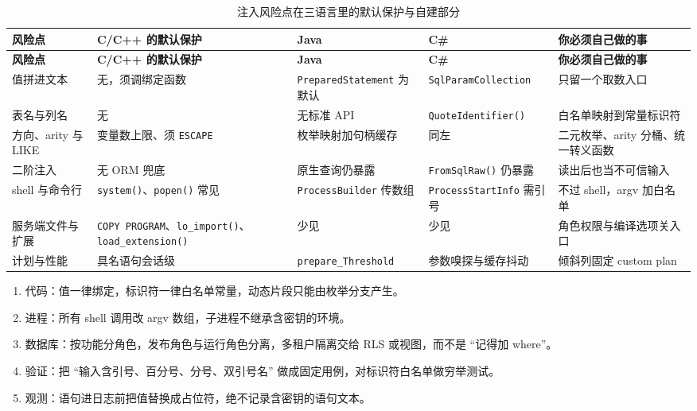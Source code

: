 \documentclass[12pt,a4paper,fontset=fandol]{ctexbook}
\newcommand{\Fn}[1]{\texttt{#1()}}
\newcommand{\Tp}[1]{\texttt{#1}}
\newcommand{\CSharp}{C\#}
\newcommand{\CppJava}{C/C++}
\begin{document}
\begin{scriptsize}
\setlength{\tabcolsep}{3pt}
\begin{longtable}{@{}>{\raggedright\arraybackslash}p{}
                  >{\raggedright\arraybackslash}p{}
                  >{\raggedright\arraybackslash}p{}
                  >{\raggedright\arraybackslash}p{}
                  >{\raggedright\arraybackslash}p{}@{}}
\caption{注入风险点在三语言里的默认保护与自建部分} \\
\toprule
\textbf{风险点} & \textbf{\CppJava{} 的默认保护} & \textbf{Java} &
\textbf{\CSharp{}} & \textbf{你必须自己做的事} \\
\midrule
\endfirsthead
\toprule
\textbf{风险点} & \textbf{\CppJava{} 的默认保护} & \textbf{Java} &
\textbf{\CSharp{}} & \textbf{你必须自己做的事} \\
\midrule
\endhead
\bottomrule
\endfoot
值拼进文本 & 无，须调绑定函数 & \Tp{Prepared\allowbreak Statement} 为默认 &
\Tp{Sql\allowbreak Param\allowbreak Collection} & 只留一个取数入口 \\
\addlinespace
表名与列名 & 无 & 无标准 API & \Fn{Quote\allowbreak Identifier} &
白名单映射到常量标识符 \\
\addlinespace
方向、arity 与 LIKE & 变量数上限、须 \texttt{ESCAPE} & 枚举映射加句柄缓存 &
同左 & 二元枚举、arity 分桶、统一转义函数 \\
\addlinespace
二阶注入 & 无 ORM 兜底 & 原生查询仍暴露 & \Fn{FromSqlRaw} 仍暴露 &
读出后也当不可信输入 \\
\addlinespace
shell 与命令行 & \Fn{system}、\Fn{popen} 常见 &
\Tp{Process\allowbreak Builder} 传数组 &
\Tp{Process\allowbreak StartInfo} 需引号 & 不过 shell，argv 加白名单 \\
\addlinespace
服务端文件与扩展 & \texttt{COPY PROGRAM}、\Fn{lo\_import}、
\Fn{load\_\allowbreak extension} & 少见 & 少见 & 角色权限与编译选项关入口 \\
\addlinespace
计划与性能 & 具名语句会话级 & \Tp{prepare\_\allowbreak Threshold} &
参数嗅探与缓存抖动 & 倾斜列固定 custom plan \\
\end{longtable}
\setlength{\tabcolsep}{6pt}
\end{scriptsize}

\begin{bestpractice}[title=可信边界最小清单]
\begin{enumerate}
  \item 代码：值一律绑定，标识符一律白名单常量，动态片段只能由枚举分支产生。
  \item 进程：所有 shell 调用改 argv 数组，子进程不继承含密钥的环境。
  \item 数据库：按功能分角色，发布角色与运行角色分离，多租户隔离交给 RLS 或视图，而不是 ``记得加 where''。
  \item 验证：把 ``输入含引号、百分号、分号、双引号名'' 做成固定用例，对标识符白名单做穷举测试。
  \item 观测：语句进日志前把值替换成占位符，绝不记录含密钥的语句文本。
\end{enumerate}
\end{bestpractice}
\end{document}
